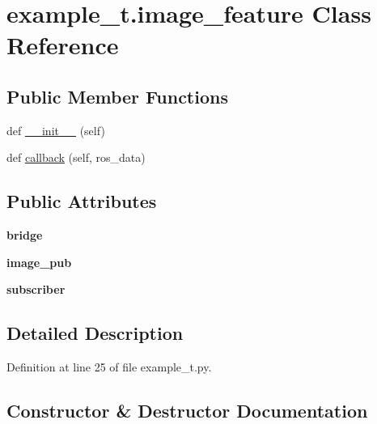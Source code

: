 \hypertarget{classexample__t_1_1image__feature}{}\section{example\+\_\+t.\+image\+\_\+feature Class Reference}
\label{classexample__t_1_1image__feature}
\subsection*{Public Member Functions}
\begin{DoxyCompactItemize}
\item 
def \hyperlink{classexample__t_1_1image__feature_ab7ca3d6ed3e0a021664f3227a389914b}{\+\_\+\+\_\+init\+\_\+\+\_\+} (self)
\item 
def \hyperlink{classexample__t_1_1image__feature_a60a162ed0cac939db1c2bccd3d884ca6}{callback} (self, ros\+\_\+data)
\end{DoxyCompactItemize}
\subsection*{Public Attributes}
\begin{DoxyCompactItemize}
\item 
{\bfseries bridge}\hypertarget{classexample__t_1_1image__feature_a9fb59c35bc2b06b5182aa610cd91022e}{}\label{classexample__t_1_1image__feature_a9fb59c35bc2b06b5182aa610cd91022e}

\item 
{\bfseries image\+\_\+pub}\hypertarget{classexample__t_1_1image__feature_aba34fa49601c8c19763cddb71c14dac7}{}\label{classexample__t_1_1image__feature_aba34fa49601c8c19763cddb71c14dac7}

\item 
{\bfseries subscriber}\hypertarget{classexample__t_1_1image__feature_a2d249499a1bbbf48756925c45a66eeec}{}\label{classexample__t_1_1image__feature_a2d249499a1bbbf48756925c45a66eeec}

\end{DoxyCompactItemize}


\subsection{Detailed Description}


Definition at line 25 of file example\+\_\+t.\+py.



\subsection{Constructor \& Destructor Documentation}
